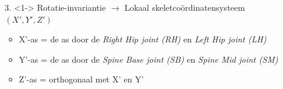 \documentclass[]{beamer}
\begin{document}
	\begin{frame}
		\begin{enumerate}
			\item[3.]<1-> Rotatie-invariantie $\rightarrow$ Lokaal skeletcoördinatensysteem $(X', Y', Z')$
			\begin{itemize}
				\item X'-as = de as door de \textit{Right Hip joint (RH)} en \textit{Left Hip joint (LH)}
				\item Y'-as = de as door de \textit{Spine Base joint (SB)} en \textit{Spine Mid joint (SM)}
				\item Z'-as = orthogonaal met X' en Y'

			\end{itemize}
	\end{enumerate}
	\end{frame}
	
	
\end{document}

